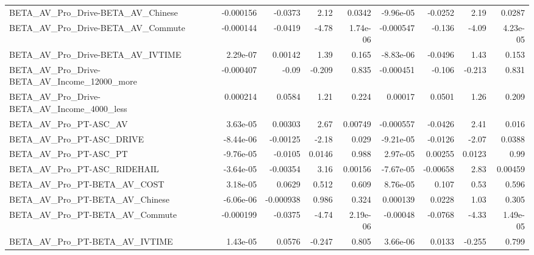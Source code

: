 \begin{tabular}{lrrrrrrrr}
BETA\_AV\_Pro\_Drive-BETA\_AV\_Chinese                  &   -0.000156 &      -0.0373 &      2.12 &   0.0342 &  -9.96e-05 &     -0.0252 &         2.19 &        0.0287 \\
BETA\_AV\_Pro\_Drive-BETA\_AV\_Commute                  &   -0.000144 &      -0.0419 &     -4.78 & 1.74e-06 &  -0.000547 &      -0.136 &        -4.09 &      4.23e-05 \\
BETA\_AV\_Pro\_Drive-BETA\_AV\_IVTIME                   &    2.29e-07 &      0.00142 &      1.39 &    0.165 &  -8.83e-06 &     -0.0496 &         1.43 &         0.153 \\
BETA\_AV\_Pro\_Drive-BETA\_AV\_Income\_12000\_more        &   -0.000407 &        -0.09 &    -0.209 &    0.835 &  -0.000451 &      -0.106 &       -0.213 &         0.831 \\
BETA\_AV\_Pro\_Drive-BETA\_AV\_Income\_4000\_less         &    0.000214 &       0.0584 &      1.21 &    0.224 &    0.00017 &      0.0501 &         1.26 &         0.209 \\
BETA\_AV\_Pro\_PT-ASC\_AV                              &    3.63e-05 &      0.00303 &      2.67 &  0.00749 &  -0.000557 &     -0.0426 &         2.41 &         0.016 \\
BETA\_AV\_Pro\_PT-ASC\_DRIVE                           &   -8.44e-06 &     -0.00125 &     -2.18 &    0.029 &  -9.21e-05 &     -0.0126 &        -2.07 &        0.0388 \\
BETA\_AV\_Pro\_PT-ASC\_PT                              &   -9.76e-05 &      -0.0105 &    0.0146 &    0.988 &   2.97e-05 &     0.00255 &       0.0123 &          0.99 \\
BETA\_AV\_Pro\_PT-ASC\_RIDEHAIL                        &   -3.64e-05 &     -0.00354 &      3.16 &  0.00156 &  -7.67e-05 &    -0.00658 &         2.83 &       0.00459 \\
BETA\_AV\_Pro\_PT-BETA\_AV\_COST                        &    3.18e-05 &       0.0629 &     0.512 &    0.609 &   8.76e-05 &       0.107 &         0.53 &         0.596 \\
BETA\_AV\_Pro\_PT-BETA\_AV\_Chinese                     &   -6.06e-06 &    -0.000938 &     0.986 &    0.324 &   0.000139 &      0.0228 &         1.03 &         0.305 \\
BETA\_AV\_Pro\_PT-BETA\_AV\_Commute                     &   -0.000199 &      -0.0375 &     -4.74 & 2.19e-06 &   -0.00048 &     -0.0768 &        -4.33 &      1.49e-05 \\
BETA\_AV\_Pro\_PT-BETA\_AV\_IVTIME                      &    1.43e-05 &       0.0576 &    -0.247 &    0.805 &   3.66e-06 &      0.0133 &       -0.255 &         0.799 \\

\end{tabular}
